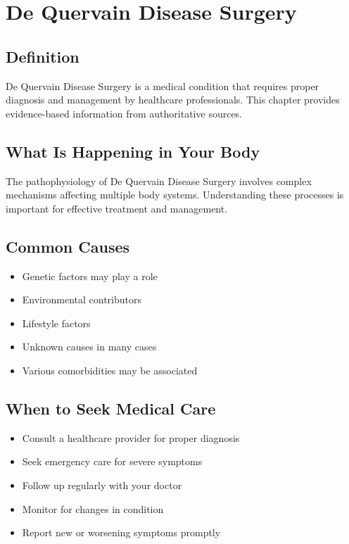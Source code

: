 
\chapter{De Quervain Disease Surgery}

\section*{Definition}
De Quervain Disease Surgery is a medical condition that requires proper diagnosis and management by healthcare professionals. This chapter provides evidence-based information from authoritative sources.

\section*{What Is Happening in Your Body}
The pathophysiology of De Quervain Disease Surgery involves complex mechanisms affecting multiple body systems. Understanding these processes is important for effective treatment and management.

\section*{Common Causes}
\begin{itemize}
  \item Genetic factors may play a role
  \item Environmental contributors
  \item Lifestyle factors
  \item Unknown causes in many cases
  \item Various comorbidities may be associated
\end{itemize}

\section*{When to Seek Medical Care}
\begin{itemize}
  \item Consult a healthcare provider for proper diagnosis
  \item Seek emergency care for severe symptoms
  \item Follow up regularly with your doctor
  \item Monitor for changes in condition
  \item Report new or worsening symptoms promptly
\end{itemize}


